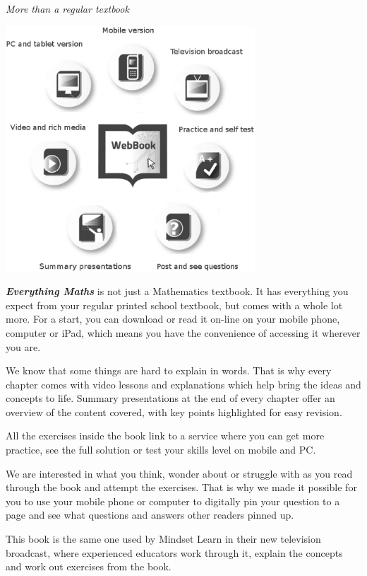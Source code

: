 
\newpage
\thispagestyle{empty}

{\normalfont\sffamily\fontsize{22}\normalfont\itshape More than a regular textbook} \par

\begin{center}
\includegraphics[width=0.70\textwidth]{title_images/morethantextbook.eps}
\end{center}

\par
{\Large
\textbf{\textit{Everything Maths}} is not just a Mathematics textbook. It has everything you expect from
your regular printed school textbook, but comes with a whole lot more. For a start, you can download or read it
on-line on your mobile phone, computer or iPad, which means you have the convenience of accessing
it wherever you are.\par


We know that some things are hard to explain in words. That is why every chapter comes with video
lessons and explanations which help bring the ideas and concepts to life. Summary presentations at
the end of every chapter offer an overview of the content covered, with key points highlighted for easy
revision.\par


All the exercises inside the book link to a service where you can get more practice, see the full solution
or test your skills level on mobile and PC.\par


We are interested in what you think, wonder about or struggle with as you read through the book and
attempt the exercises. That is why we made it possible for you to use your mobile phone or computer to
digitally pin your question to a page and see what questions and answers other readers pinned up.\par


This book is the same one used by Mindset Learn in their new television broadcast, where experienced educators work through it, explain the concepts and work out exercises from the book.
}




